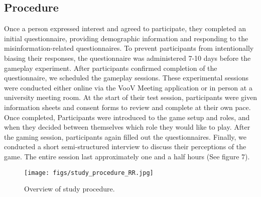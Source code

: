 \subsection{Procedure}
Once a person expressed interest and agreed to participate, they completed an initial questionnaire, providing demographic information and responding to the misinformation-related questionnaires. To prevent participants from intentionally biasing their responses, the questionnaire was administered 7-10 days before the gameplay experiment. After participants confirmed completion of the questionnaire, we scheduled the gameplay sessions. These experimental sessions were conducted either online via the VooV Meeting application or in person at a university meeting room. At the start of their test session, participants were given information sheets and consent forms to review and complete at their own pace. Once completed, Participants were introduced to the game setup and roles, and when they decided between themselves which role they would like to play. After the gaming session, participants again filled out the questionnaires. Finally, we conducted a short semi-structured interview to discuss their perceptions of the game. The entire session last approximately one and a half hours (See figure 7). 
\begin{figure}[htbp]
    \centering
    \texttt{[image: figs/study\_procedure\_RR.jpg]}
    \caption{Overview of study procedure.}
    \label{fig:study procedure}
\end{figure}


